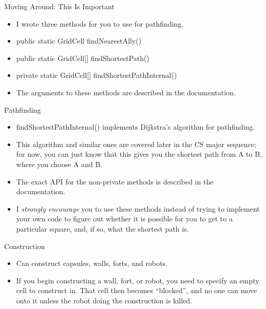 \documentclass[aspectratio=169]{beamer}
\begin{document}
\begin{frame}{Moving Around: This Is Important}
  \begin{itemize}
  \item I wrote three methods for you to use for pathfinding.
  \item public static GridCell findNearestAlly()
  \item public static GridCell[] findShortestPath()
  \item private static GridCell[] findShortestPathInternal()
  \item The arguments to these methods are described in the
    documentation.
  \end{itemize}
\end{frame}

\begin{frame}{Pathfinding}
  \begin{itemize}
  \item findShortestPathInternal() implements Dijkstra's algorithm for
    pathfinding.
  \item This algorithm and similar ones are covered later in the CS
    major sequence; for now, you can just know that this gives you the
    shortest path from A to B, where you choose A and B.
  \item The exact API for the non-private methods is described in the
    documentation.
  \item I \emph{strongly encourage} you to use these methods instead
    of trying to implement your own code to figure out whether it is
    possible for you to get to a particular square, and, if so, what
    the shortest path is.
  \end{itemize}
\end{frame}

\begin{frame}{Construction}
  \begin{itemize}
  \item Can construct capsules, walls, forts, and robots.
  \item If you begin constructing a wall, fort, or robot, you need to
    specify an empty cell to construct in.  That cell then becomes
    ``blocked'', and no one can move onto it unless the robot doing
    the construction is killed.
  \end{itemize}
\end{frame}
\end{document}
